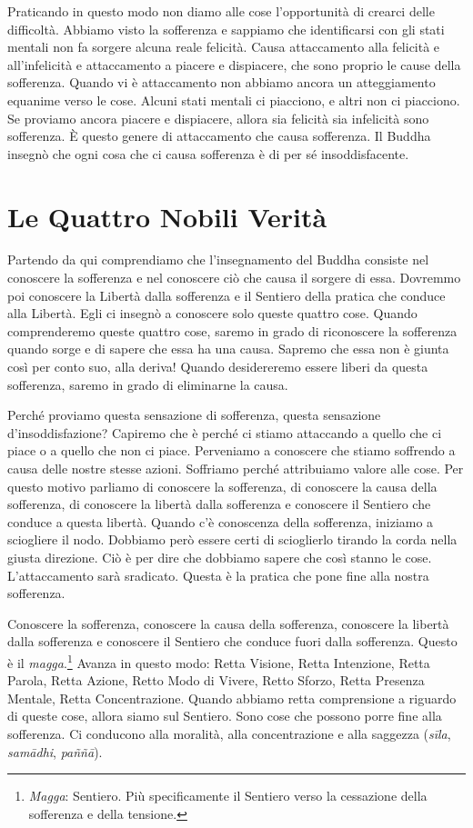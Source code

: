 Praticando in questo modo non diamo alle cose l'opportunità di crearci
delle difficoltà. Abbiamo visto la sofferenza e sappiamo che
identificarsi con gli stati mentali non fa sorgere alcuna reale
felicità. Causa attaccamento alla felicità e all'infelicità e
attaccamento a piacere e dispiacere, che sono proprio le cause della
sofferenza. Quando vi è attaccamento non abbiamo ancora un atteggiamento
equanime verso le cose. Alcuni stati mentali ci piacciono, e altri non
ci piacciono. Se proviamo ancora piacere e dispiacere, allora sia
felicità sia infelicità sono sofferenza. È questo genere di attaccamento
che causa sofferenza. Il Buddha insegnò che ogni cosa che ci causa
sofferenza è di per sé insoddisfacente.

\section{Le Quattro Nobili Verità}

Partendo da qui comprendiamo che l'insegnamento del Buddha consiste nel
conoscere la sofferenza e nel conoscere ciò che causa il sorgere di
essa. Dovremmo poi conoscere la Libertà dalla sofferenza e il Sentiero
della pratica che conduce alla Libertà. Egli ci insegnò a conoscere solo
queste quattro cose. Quando comprenderemo queste quattro cose, saremo in
grado di riconoscere la sofferenza quando sorge e di sapere che essa ha
una causa. Sapremo che essa non è giunta così per conto suo, alla
deriva! Quando desidereremo essere liberi da questa sofferenza, saremo
in grado di eliminarne la causa.

Perché proviamo questa sensazione di sofferenza, questa sensazione
d'insoddisfazione? Capiremo che è perché ci stiamo attaccando a quello
che ci piace o a quello che non ci piace. Perveniamo a conoscere che
stiamo soffrendo a causa delle nostre stesse azioni. Soffriamo perché
attribuiamo valore alle cose. Per questo motivo parliamo di conoscere la
sofferenza, di conoscere la causa della sofferenza, di conoscere la
libertà dalla sofferenza e conoscere il Sentiero che conduce a questa
libertà. Quando c'è conoscenza della sofferenza, iniziamo a sciogliere
il nodo. Dobbiamo però essere certi di scioglierlo tirando la corda
nella giusta direzione. Ciò è per dire che dobbiamo sapere che così
stanno le cose. L'attaccamento sarà sradicato. Questa è la pratica che
pone fine alla nostra sofferenza.

Conoscere la sofferenza, conoscere la causa della sofferenza, conoscere
la libertà dalla sofferenza e conoscere il Sentiero che conduce fuori
dalla sofferenza. Questo è il \emph{magga}.\footnote{\emph{Magga}:
  Sentiero. Più specificamente il Sentiero verso la cessazione della
  sofferenza e della tensione.} Avanza in questo modo: Retta Visione,
Retta Intenzione, Retta Parola, Retta Azione, Retto Modo di Vivere,
Retto Sforzo, Retta Presenza Mentale, Retta Concentrazione. Quando
abbiamo retta comprensione a riguardo di queste cose, allora siamo sul
Sentiero. Sono cose che possono porre fine alla sofferenza. Ci conducono
alla moralità, alla concentrazione e alla saggezza (\emph{sīla},
\emph{samādhi}, \emph{paññā}).

